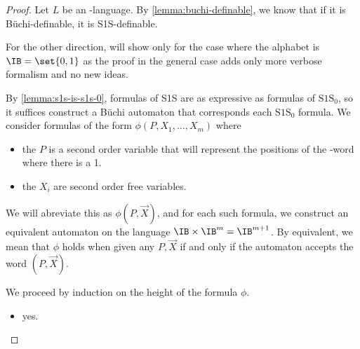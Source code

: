 \begin{proof}
    Let $L$ be an \w-language. By \autoref{lemma:buchi-definable},
    we know that if it is Büchi-definable, it is S1S-definable.

    For the other direction, will show only for the case
    where the alphabet is $\IB = \set{0, 1}$ as the proof
    in the general case adds only more verbose formalism and no new ideas.

    By \autoref{lemma:s1s-is-s1s-0}, formulas of S1S
    are as expressive as formulas of $\text{S1S}_0$,
    so it suffices construct a Büchi automaton
    that corresponds each $\text{S1S}_0$ formula.
    We consider formulas of the form
    $\phi(P, X_1, \dots, X_m)$
    where \begin{itemize}
        \item the $P$ is a second order variable that will
            represent the positions of the \w-word where there is a 1.
        \item the $X_i$ are second order free variables.
    \end{itemize}
    We will abreviate this as $\phi(P, \vec X)$,
    and for each such formula, we construct an equivalent
    automaton on the language $\IB \times \IB^m = \IB^{m+1}$.
    By equivalent, we mean that $\phi$ holds when given any $P, \vec X$
    if and only if the automaton accepts the word $(P, \vec X)$.

    We proceed by induction on the height of the formula $\phi$.

    \begin{itemize}
        \item yes.
    \end{itemize}




\end{proof}
